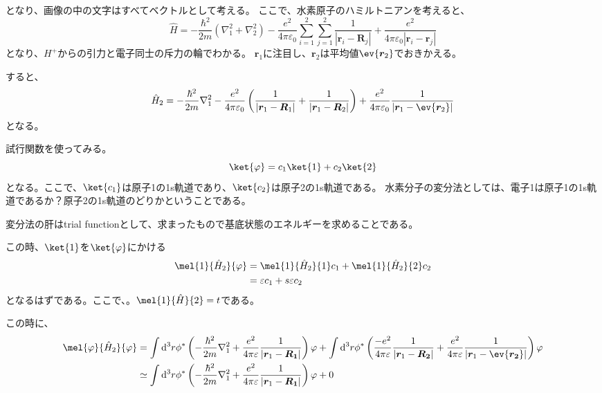 \documentclass[titlepage]{ltjsarticle}
\begin{document}
となり、画像の中の文字はすべてベクトルとして考える。
ここで、水素原子のハミルトニアンを考えると、
\begin{equation}
  \hat{H} = -\frac{\hbar^2}{2m} (\nabla_1^2 + \nabla_2^2) - \frac{e^2}{4\pi \varepsilon_0 } \sum^2_{i=1} \sum^2_{j=1} \frac{1}{|\bm{r}_i-\bm{R}_j|} +  \frac{e^2}{4\pi \varepsilon_0 |\bm{r}_i-\bm{r}_j|}
\end{equation}
となり、\(H^+\)からの引力と電子同士の斥力の輪でわかる。
\(\bm{r}_1\)に注目し、\(\bm{r}_2\)は平均値\(\ev{\bm{r}_2}\)でおきかえる。

すると、
\begin{equation}
  \hat{H}_2 = -\frac{\hbar^2}{2m} \nabla_1^2 -\frac{e^2}{4\pi \varepsilon_0} \left( 
    \frac{1}{|\bm{r}_1-\bm{R}_1|} + \frac{1}{|\bm{r}_1-\bm{R}_2|} 
   \right) 
   + \frac{e^2}{4\pi \varepsilon_0} \frac{1}{|\bm{r}_1-\ev{\bm{r}_2}|}
\end{equation}
となる。

試行関数を使ってみる。
\begin{equation}
  \ket{\varphi} = c_1 \ket{1} + c_2 \ket{2}
\end{equation}
となる。ここで、\(\ket{c_1}\)は原子1の1s軌道であり、\(\ket{c_2}\)は原子2の1s軌道である。
水素分子の変分法としては、電子1は原子1の1s軌道であるか？原子2の1s軌道のどりかということである。


変分法の肝はtrial functionとして、求まったもので基底状態のエネルギーを求めることである。

この時、\(\ket{1}\)を\(\ket{\varphi}\)にかける
\begin{align}
  \mel{1}{\hat{H}_2}{\varphi}  & = \mel{1}{\hat{H}_2}{1}c_1 + \mel{1}{\hat{H}_2}{2}c_2\\
  & = \varepsilon c_1 + s\varepsilon c_2
\end{align}
となるはずである。ここで、。\(\mel{1}{\hat{H}}{2}=t\)である。


この時に、
\begin{align}
  \mel{\varphi}{\hat{H}_2}{\varphi} & = \int \odif[order=3]{r} \phi^\ast \left( -\frac{\hbar^2}{2m}\nabla^2_1 + \frac{e^2}{4\pi \varepsilon}\frac{1}{|\bm{r}_1-\bm{R_1}|} \right) \varphi + 
  \int \odif[order=3]{r} \phi^\ast \left( \frac{-e^2}{4\pi \varepsilon}\frac{1}{|\bm{r}_1-\bm{R_2}|}+ \frac{e^2}{4\pi \varepsilon}\frac{1}{|\bm{r}_1-\ev{\bm{r_2}}|} \right) \varphi \\
  & \simeq  \int \odif[order=3]{r} \phi^\ast \left( -\frac{\hbar^2}{2m}\nabla^2_1 + \frac{e^2}{4\pi \varepsilon}\frac{1}{|\bm{r}_1-\bm{R_1}|} \right) \varphi + 0
\end{align}
\end{document}
